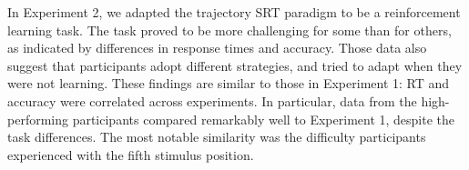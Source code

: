 \documentclass[man,floatsintext]{apa6}
\begin{document}



In Experiment 2, we adapted the trajectory SRT paradigm to be a reinforcement learning task. The task proved to be more challenging for some than for others, as indicated by differences in response times and accuracy. Those data also suggest that participants adopt different strategies, and tried to adapt when they were not learning. These findings are similar to those in Experiment 1: RT and accuracy were correlated across experiments. In particular, data from the high-performing participants compared remarkably well to Experiment 1, despite the task differences. The most notable similarity was the difficulty participants experienced with the fifth stimulus position. 
\end{document}
